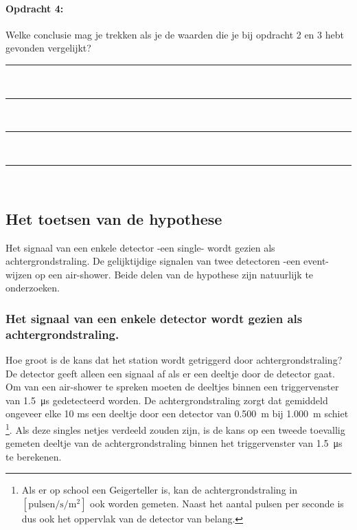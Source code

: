 \bigskip{}


\begin{minipage}[t]{1\columnwidth}%

\paragraph{Opdracht 4:}

Welke conclusie mag je trekken als je de waarden die je bij
opdracht 2 en 3 hebt gevonden vergelijkt?

\begin{center}
    \rule{\textwidth}{0.3mm}\\
    \rule{\textwidth}{0.3mm}\\
    \rule{\textwidth}{0.3mm}\\
    \rule{\textwidth}{0.3mm}\\
\end{center}
\end{minipage}


\subsection{Het toetsen van de hypothese}

Het signaal van een enkele detector -een single- wordt gezien als
achtergrondstraling. De gelijktijdige signalen van twee detectoren
-een event- wijzen op een air-shower. Beide delen van de hypothese
zijn natuurlijk te onderzoeken.


\subsubsection{Het signaal van een enkele detector wordt gezien als achtergrondstraling.}

Hoe groot is de kans dat het station wordt getriggerd door achtergrondstraling?
De detector geeft alleen een signaal af als er een deeltje door de
detector gaat. Om van een air-shower te spreken moeten de deeltjes
binnen een triggervenster van \SI{1.5}{\micro\second} gedetecteerd
worden. De achtergrondstraling zorgt dat gemiddeld ongeveer elke
10 ms een deeltje door een detector van \SI{0.500}{\meter} bij \SI{1.000}{\meter}
schiet%
\footnote{Als er op school een Geigerteller is, kan de achtergrondstraling in
$\mathrm{\left[pulsen/s/m^{2}\right]}$ ook worden gemeten. Naast
het aantal pulsen per seconde is dus ook het oppervlak van de detector
van belang.%
}. Als deze singles netjes verdeeld zouden zijn, is de kans op een
tweede toevallig gemeten deeltje van de achtergrondstraling binnen
het triggervenster van \SI{1.5}{\micro\second} te berekenen.

